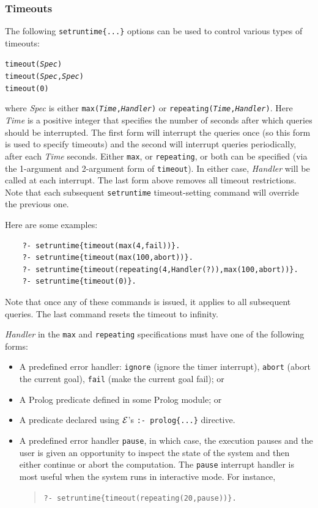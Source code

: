 \documentclass[11pt]{article}
\newcommand{\ERGO}{\mbox{\ensuremath{\cal{E}}\smaller{{\sc{RGO}}}}\xspace}
\newcommand{\FLSYSTEM}{\ERGO}
\begin{document}
\subsubsection{Timeouts}
The following \texttt{setruntime\{...\}} options
can be used to control various types of timeouts:
\begin{alltt}
    timeout(\emph{Spec})
    timeout(\emph{Spec},\emph{Spec})
    timeout(0)
\end{alltt}
where \emph{Spec} is  either \texttt{max(\emph{Time},\emph{Handler})} or
\texttt{repeating(\emph{Time},\emph{Handler})}.
Here \emph{Time} is a positive integer that specifies the number of seconds
after which queries should be interrupted. The first form will interrupt
the queries once (so this form is used to specify timeouts) and the
second will interrupt queries periodically, after each \emph{Time} seconds. 
Either \texttt{max}, or \texttt{repeating}, or both can be specified
(via the 1-argument and 2-argument form of \texttt{timeout}).
In either case, \emph{Handler} will be called at each interrupt.
The last form above removes all timeout restrictions.
Note that each subsequent \texttt{setruntime} timeout-setting command 
will override the previous one.

Here are some examples:
\begin{verbatim}
    ?- setruntime{timeout(max(4,fail))}.
    ?- setruntime{timeout(max(100,abort))}.
    ?- setruntime{timeout(repeating(4,Handler(?)),max(100,abort))}.
    ?- setruntime{timeout(0)}.
\end{verbatim}
Note that once any of these commands is issued, it applies to all
subsequent queries.  The last command resets the timeout to infinity.

\noindent
{}
\emph{Handler} in the \texttt{max} and \texttt{repeating}
specifications must have one of the following forms:
  \begin{itemize}
  \item A predefined error handler: \texttt{ignore} (ignore the timer
    interrupt), \texttt{abort} (abort the current goal), \texttt{fail}
    (make the current goal fail); or
  \item A Prolog predicate defined in some Prolog module; or
  \item A predicate declared using \FLSYSTEM's \texttt{:- prolog\{...\}} directive.
  \item A predefined error handler \texttt{pause}, 
    in which case, the execution pauses and the user is
    given an
    opportunity to inspect the state of the system and then either continue
    or abort the computation.
  The \texttt{pause} interrupt handler is  most useful when the
  system runs in interactive mode. 
  For instance,
  \begin{quote}
    \texttt{?- setruntime\{timeout(repeating(20,pause))\}.}     
  \end{quote}
  \end{itemize}
\end{document}
